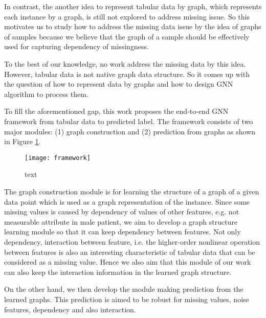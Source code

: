 In contrast, the another idea to represent tabular data by graph, which represents each instance by a graph, is still not explored to address missing issue.
So this motivates us to study how to address the missing data issue by the idea of graphs of samples because we believe that the graph of a sample should be effectively used for capturing dependency of missingness.

To the best of our knowledge, no work address the missing data by this idea.
However, tabular data is not native graph data structure.
So it comes up with the question of how to represent data by graphs and how to design GNN algorithm to process them.

To fill the aforementioned gap, this work proposes the end-to-end GNN framework from tabular data to predicted label.
The framework consists of two major modules: (1) graph construction and (2) prediction from graphs as shown in Figure \ref{framework}.

\begin{figure}[h]
	\centering
	\texttt{[image: framework]}
	\caption{text}\label{framework}
\end{figure}

 
The graph construction module is for learning the structure of a graph of a given data point which is used as a graph representation of the instance.
Since some missing values is caused by dependency of values of other features, e.g. not measurable attribute in male patient, we aim to develop a graph structure learning module so that it can keep dependency between features.
Not only dependency, interaction between feature, i.e. the higher-order nonlinear operation between features is also an interesting characteristic of tabular data that can be considered as a missing value.
Hence we also aim that this module of our work can also keep the interaction information in the learned graph structure.

On the other hand, we then develop the module making prediction from the learned graphs.
This prediction is aimed to be robust for missing values, noise features, dependency and also interaction.


